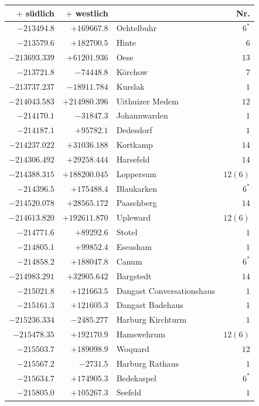 \clearpage{}%
\begin{center}\begingroup\fontsize{8}{9}\selectfont
\setlength{\tabcolsep}{4pt}
\begin{tabular}{r|r|p{170pt}|r}\hline
\(+\) südlich&\(+\) westlich&&Nr.\\\hline
\(-213494.8\)&\(+169667.8\)&Ochtelbuhr&\(6^{*}\)\\
\(-213579.6\)&\(+182700.5\)&Hinte&\(6\)\\
\(-213693.339\)&\(+61201.936\)&Oese&\(13\)\\
\(-213721.8\)&\(-74448.8\)&Körchow&\(7\)\\
\(-213737.237\)&\(-18911.784\)&Kurslak&\(1\)\\
\(-214043.583\)&\(+214980.396\)&Uithuizer Medem&\(12\)\\
\(-214170.1\)&\(-31847.3\)&Johannwarden&\(1\)\\
\(-214187.1\)&\(+95782.1\)&Dedesdorf&\(1\)\\
\(-214237.022\)&\(+31036.188\)&Kortkamp&\(14\)\\
\(-214306.492\)&\(+29258.444\)&Harsefeld&\(14\)\\
\(-214388.315\)&\(+188200.045\)&Loppersum&\(12 (6)\)\\
\(-214396.5\)&\(+175488.4\)&Blaukarken&\(6^{*}\)\\
\(-214520.078\)&\(+28565.172\)&Paaschberg&\(14\)\\
\(-214613.820\)&\(+192611.870\)&Upleward&\(12 (6)\)\\
\(-214771.6\)&\(+89292.6\)&Stotel&\(1\)\\
\(-214805.1\)&\(+99852.4\)&Eseasham&\(1\)\\
\(-214858.2\)&\(+188047.8\)&Canum&\(6^{*}\)\\
\(-214983.291\)&\(+32905.642\)&Bargstedt&\(14\)\\
\(-215021.8\)&\(+121663.5\)&Dangast Conversationshaus&\(1\)\\
\(-215161.3\)&\(+121605.3\)&Dangast Badehaus&\(1\)\\
\(-215236.334\)&\(-2485.277\)&Harburg Kirchturm&\(1\)\\
\(-215478.35\)&\(+192170.9\)&Hamswehrum&\(12 (6)\)\\
\(-215503.7\)&\(+189098.9\)&Woquard&\(12\)\\
\(-215567.2\)&\(-2731.5\)&Harburg Rathaus&\(1\)\\
\(-215634.7\)&\(+174905.3\)&Bedekaspel&\(6^{*}\)\\
\(-215805.0\)&\(+105267.3\)&Seefeld&\(1\)\\

\end{tabular}
\end{center}
